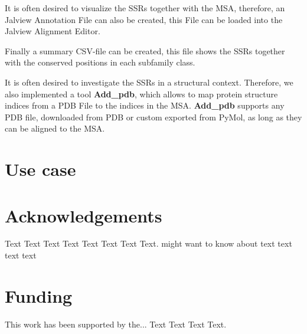 \documentclass{bioinfo}
\begin{document}
\begin{methods}
It is often desired to visualize the SSRs together with the MSA, therefore,
an Jalview Annotation File can also be created, this File can be loaded into 
the Jalview Alignment Editor.

Finally a summary CSV-file can be created, this file shows the SSRs
together with the conserved positions in each subfamily class. 

It is often desired to investigate the SSRs in a structural context. 
Therefore, we also implemented a tool \textbf{Add\_pdb}, which allows to 
map protein structure indices from a PDB File to the indices in the MSA.
\textbf{Add\_pdb} supports any PDB file, downloaded from PDB or custom exported from 
PyMol, as long as they can be aligned to the MSA.

\end{methods}


\section{Use case}


\section*{Acknowledgements}

Text Text Text Text Text Text  Text Text.  \citealp{Boffelli03} might want to know about  text
text text text\vspace*{-12pt}

\section*{Funding}

This work has been supported by the... Text Text  Text Text.\vspace*{-12pt}

%
%
%
%
%
%
%
%
%
\end{document}
